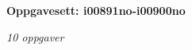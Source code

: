 \centerline{\bf Oppgavesett: i00891no-i00900no}
\vskip 10pt
\centerline{\it 10 oppgaver}\vskip 10pt
\vskip 10pt
